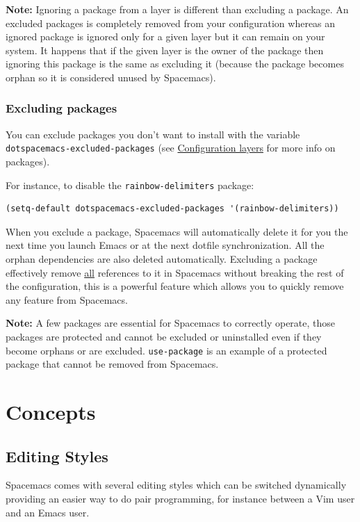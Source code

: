 \documentclass[11pt]{article}
\begin{document}
\textbf{Note:} Ignoring a package from a layer is different than excluding a package.
An excluded packages is completely removed from your configuration whereas an
ignored package is ignored only for a given layer but it can remain on your
system. It happens that if the given layer is the owner of the package then
ignoring this package is the same as excluding it (because the package becomes
orphan so it is considered unused by Spacemacs).

\subsubsection{Excluding packages}
\label{sec:orgcff082d}
You can exclude packages you don't want to install with the variable
\texttt{dotspacemacs-excluded-packages} (see \hyperref[sec:org5007336]{Configuration layers} for more info
on packages).

For instance, to disable the \texttt{rainbow-delimiters} package:

\begin{verbatim}
(setq-default dotspacemacs-excluded-packages '(rainbow-delimiters))
\end{verbatim}

When you exclude a package, Spacemacs will automatically delete it for you the
next time you launch Emacs or at the next dotfile synchronization. All the
orphan dependencies are also deleted automatically. Excluding a package
effectively remove \uline{all} references to it in Spacemacs without breaking the rest
of the configuration, this is a powerful feature which allows you to quickly
remove any feature from Spacemacs.

\textbf{Note:} A few packages are essential for Spacemacs to correctly operate, those
packages are protected and cannot be excluded or uninstalled even if they become
orphans or are excluded. \texttt{use-package} is an example of a protected package that
cannot be removed from Spacemacs.

\section{Concepts}
\label{sec:org5c33db4}
\subsection{Editing Styles}
\label{sec:orgc22d20b}
Spacemacs comes with several editing styles which can be switched dynamically
providing an easier way to do pair programming, for instance between a Vim user
and an Emacs user.
\end{document}
